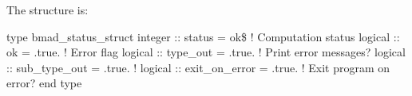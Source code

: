 The  structure is:
\begin{example}
type bmad_status_struct
  integer :: status         = ok\$     ! Computation status 
  logical :: ok             = .true.   ! Error flag
  logical :: type_out       = .true.   ! Print error messages?
  logical :: sub_type_out   = .true.   ! 
  logical :: exit_on_error  = .true.   ! Exit program on error?
end type
\end{example}





